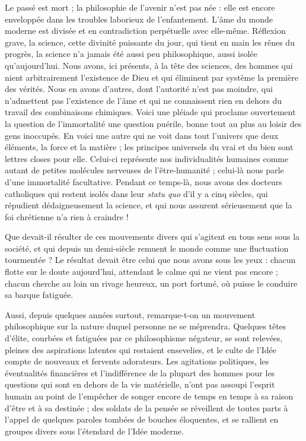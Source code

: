 \documentclass[a4paper, 11pt, oneside]{article}
\begin{document}
Le passé est mort ; la philosophie de l'avenir n'est pas née : elle est encore enveloppée dans les troubles laborieux de l'enfantement. L'âme du monde moderne est divisée et en contradiction perpétuelle avec elle-même. Réflexion grave, la science, cette divinité puissante du jour, qui tient en main les rênes du progrès, la science n'a jamais été aussi peu philosophique, aussi isolée qu'aujourd'hui. Nous avons, ici présents, à la tête des sciences, des hommes qui nient arbitrairement l'existence de Dieu et qui éliminent par système la première des vérités. Nous en avons d'autres, dont l'autorité n'est pas moindre, qui n'admettent pas l'existence de l'âme et qui ne connaissent rien en dehors du travail des combinaisons chimiques. Voici une pléiade qui proclame ouvertement la question de l'immortalité une question puérile, bonne tout au plus au loisir des gens inoccupés. En voici une autre qui ne voit dans tout l'univers que deux éléments, la force et la matière ; les principes universels du vrai et du bien sont lettres closes pour elle. Celui-ci représente nos individualités humaines comme autant de petites molécules nerveuses de l'être-humanité ; celui-là nous parle d'une immortalité facultative. Pendant ce temps-là, nous avons des docteurs catholiques qui restent isolés dans leur \emph{statu quo} d'il y a cinq siècles, qui répudient dédaigneusement la science, et qui nous assurent sérieusement que la foi chrétienne n'a rien à craindre !

Que devait-il résulter de ces mouvements divers qui s'agitent en tous sens sous la société, et qui depuis un demi-siècle remuent le monde comme une fluctuation tourmentée ? Le résultat devait être celui que nous avons sous les yeux : chacun flotte sur le doute aujourd'hui, attendant le calme qui ne vient pas encore ; chacun cherche au loin un rivage heureux, un port fortuné, où puisse le conduire sa barque fatiguée.

Aussi, depuis quelques années surtout, remarque-t-on un mouvement philosophique sur la nature duquel personne ne se méprendra. Quelques têtes d'élite, courbées et fatiguées par ce philosophisme négateur, se sont relevées, pleines des aspirations latentes qui restaient ensevelies, et le culte de l'Idée compte de nouveaux et fervents adorateurs. Les agitations politiques, les éventualités financières et l'indifférence de la plupart des hommes pour les questions qui sont en dehors de la vie matérielle, n'ont pas assoupi l'esprit humain au point de l'empêcher de songer encore de temps en temps à sa raison d'être et à sa destinée ; des soldats de la pensée se réveillent de toutes parts à l'appel de quelques paroles tombées de bouches éloquentes, et se rallient en groupes divers sous l'étendard de l'Idée moderne.
\end{document}
